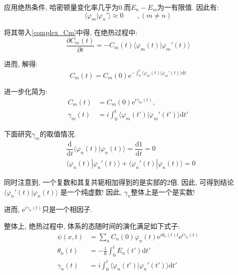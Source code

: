 \documentclass[a4paper, 11pt]{article}
\begin{document}
\begin{spacing}{1.2}
        应用绝热条件, 哈密顿量变化率几乎为0.而$E_n-E_m$为一有限值.
        因此有:
        \begin{equation}
          \langle\varphi_m|\varphi_n'\rangle \approx 0 \qquad, (m\ne{}n)
        \end{equation}
        
        将其带入\eqref{complex_Cm}中得, 在绝热过程中:
        \begin{equation}
          \dfrac{\partial{}C_m(t)}{\partial{}t} = -C_m(t)\langle\varphi_m(t)|\varphi_m'(t)\rangle
        \end{equation}
        
        进而, 解得:
        \begin{equation}
          C_m(t) = C_m(0)\mathrm{e}^{-\int_0^t\langle\varphi_m(t)|\varphi_m'(t)\rangle{}\mathrm{d}t}
        \end{equation}
        
        进一步化简为:
        \begin{equation}
          \begin{aligned}
            C_m(t) &= C_m(0)\mathrm{e}^{i\gamma_m(t)}, \\
            \gamma_m(t) &= i\int_0^t\langle\varphi_m(t')|\varphi_m'(t')\rangle{}\mathrm{d}t'
          \end{aligned}
        \end{equation} 

        下面研究$\gamma_m$的取值情况.
        \begin{equation}
          \begin{aligned}
            &\dfrac{\mathrm{d}}{\mathrm{d}t}\langle\varphi_n(t)|\varphi_n(t)\rangle = \dfrac{\mathrm{d}1}{\mathrm{d}t} = 0\\
            &\langle\varphi_n(t)|\varphi_n'(t)\rangle +\langle\varphi_n'(t)|\varphi_n(t)\rangle = 0
          \end{aligned}
        \end{equation}
        
        同时注意到, 一个复数和其复共轭相加得到的是实部的2倍. 因此, 可得到结论$\langle\varphi_n'(t)|\varphi_n(t)\rangle$
        是一个纯虚数!
        因此, $\gamma_n$整体上是一个是实数!

        进而, $\mathrm{e}^{i\gamma_n(t)}$只是一个相因子.
        
        整体上, 绝热过程中, 体系的态随时间的演化满足如下式子:
        \begin{equation}
          \label{fin_res_jr}
          \begin{aligned}
            \psi(x, t) &= \sum_nC_n(0)\varphi_n(t)\mathrm{e}^{i\theta_n(t)t}\mathrm{e}^{i\gamma_n(t)}\\
            \theta_n(t) &= -\frac{1}{\hbar}\int_0^{t}E_n(t')\mathrm{d}t'\\
            \gamma_n(t) &= i\int_0^t\langle\varphi_n(t')|\varphi_n'(t')\rangle{}\mathrm{d}t'
          \end{aligned}
        \end{equation} 


\end{spacing}
\end{document}

